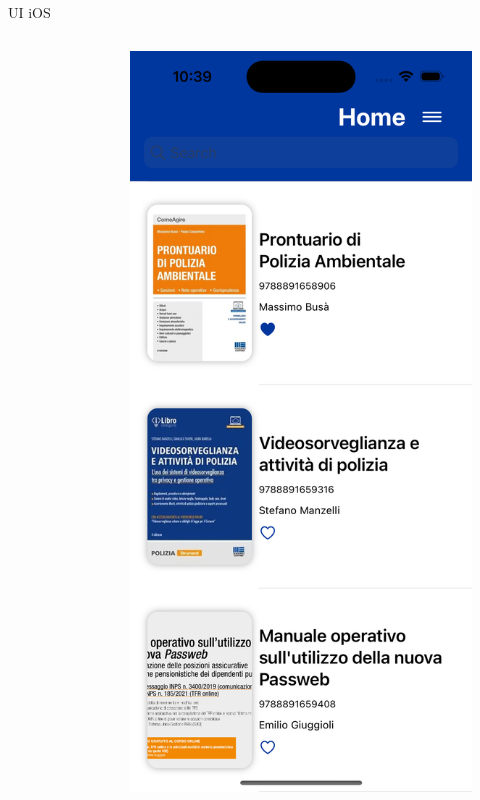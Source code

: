 \begin{frame}{UI iOS}
\begin{columns}[onlytextwidth]
\begin{column}{0.24\textwidth}
\begin{figure}[H]
            \end{figure}
        \end{column}
        \begin{column}{0.24\textwidth}
             \begin{figure}[H]
                \includegraphics[width=1\textwidth]{img/home_ios.png}

\end{figure}
\end{column}
\end{columns}
\end{frame}
